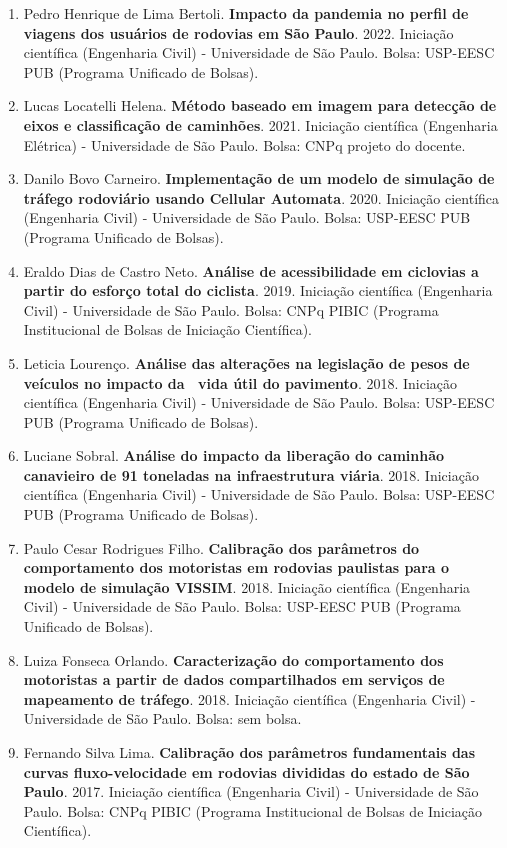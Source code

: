 \documentclass[
  brazilian,
  11pt,
  a4paper,
]{article}
\begin{document}
\begin{enumerate}
\item
  Pedro Henrique de Lima Bertoli. \textbf{Impacto da pandemia no perfil
  de viagens dos usuários de rodovias em São Paulo}. 2022. Iniciação
  científica (Engenharia Civil) - Universidade de São Paulo. Bolsa:
  USP-EESC PUB (Programa Unificado de Bolsas).
\item
  Lucas Locatelli Helena. \textbf{Método baseado em imagem para detecção
  de eixos e classificação de caminhões}. 2021. Iniciação científica
  (Engenharia Elétrica) - Universidade de São Paulo. Bolsa: CNPq projeto
  do docente.
\item
  Danilo Bovo Carneiro. \textbf{Implementação de um modelo de simulação
  de tráfego rodoviário usando Cellular Automata}. 2020. Iniciação
  científica (Engenharia Civil) - Universidade de São Paulo. Bolsa:
  USP-EESC PUB (Programa Unificado de Bolsas).
\item
  Eraldo Dias de Castro Neto. \textbf{Análise de acessibilidade em
  ciclovias a partir do esforço total do ciclista}. 2019. Iniciação
  científica (Engenharia Civil) - Universidade de São Paulo. Bolsa: CNPq
  PIBIC (Programa Institucional de Bolsas de Iniciação Científica).
\item
  Leticia Lourenço. \textbf{Análise das alterações na legislação de
  pesos de veículos no impacto da~ vida útil do pavimento}. 2018.
  Iniciação científica (Engenharia Civil) - Universidade de São Paulo.
  Bolsa: USP-EESC PUB (Programa Unificado de Bolsas).
\item
  Luciane Sobral. \textbf{Análise do impacto da liberação do caminhão
  canavieiro de 91 toneladas na infraestrutura viária}. 2018. Iniciação
  científica (Engenharia Civil) - Universidade de São Paulo. Bolsa:
  USP-EESC PUB (Programa Unificado de Bolsas).
\item
  Paulo Cesar Rodrigues Filho. \textbf{Calibração dos parâmetros do
  comportamento dos motoristas em rodovias paulistas para o modelo de
  simulação VISSIM}. 2018. Iniciação científica (Engenharia Civil) -
  Universidade de São Paulo. Bolsa: USP-EESC PUB (Programa Unificado de
  Bolsas).
\item
  Luiza Fonseca Orlando. \textbf{Caracterização do comportamento dos
  motoristas a partir de dados compartilhados em serviços de mapeamento
  de tráfego}. 2018. Iniciação científica (Engenharia Civil) -
  Universidade de São Paulo. Bolsa: sem bolsa.
\item
  Fernando Silva Lima. \textbf{Calibração dos parâmetros fundamentais
  das curvas fluxo-velocidade em rodovias divididas do estado de São
  Paulo}. 2017. Iniciação científica (Engenharia Civil) - Universidade
  de São Paulo. Bolsa: CNPq PIBIC (Programa Institucional de Bolsas de
  Iniciação Científica).
\end{enumerate}
\end{document}
